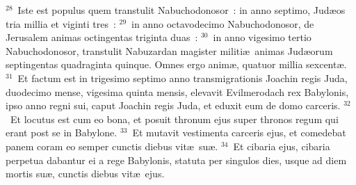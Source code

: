 ${}^{28}$~Iste est populus quem transtulit Nabuchodonosor~: in anno septimo, Jud\ae os tria millia et viginti tres~:
${}^{29}$~in anno octavodecimo Nabuchodonosor, de Jerusalem animas octingentas triginta duas~:
${}^{30}$~in anno vigesimo tertio Nabuchodonosor, transtulit Nabuzardan magister militi\ae\ animas Jud\ae orum septingentas quadraginta quinque. Omnes ergo anim\ae , quatuor millia sexcent\ae .
${}^{31}$~Et factum est in trigesimo septimo anno transmigrationis Joachin regis Juda, duodecimo mense, vigesima quinta mensis, elevavit Evilmerodach rex Babylonis, ipso anno regni sui, caput Joachin regis Juda, et eduxit eum de domo carceris.
${}^{32}$~Et locutus est cum eo bona, et posuit thronum ejus super thronos regum qui erant post se in Babylone.
${}^{33}$~Et mutavit vestimenta carceris ejus, et comedebat panem coram eo semper cunctis diebus vit\ae\ su\ae .
${}^{34}$~Et cibaria ejus, cibaria perpetua dabantur ei a rege Babylonis, statuta per singulos dies, usque ad diem mortis su\ae , cunctis diebus vit\ae\ ejus.
